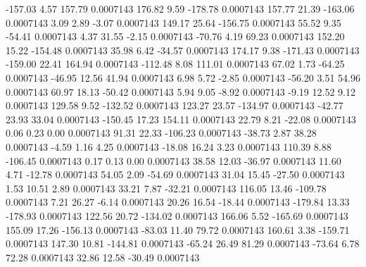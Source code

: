      -157.03        4.57      157.79     0.0007143
      176.82        9.59     -178.78     0.0007143
      157.77       21.39     -163.06     0.0007143
        3.09        2.89       -3.07     0.0007143
      149.17       25.64     -156.75     0.0007143
       55.52        9.35      -54.41     0.0007143
        4.37       31.55       -2.15     0.0007143
      -70.76        4.19       69.23     0.0007143
      152.20       15.22     -154.48     0.0007143
       35.98        6.42      -34.57     0.0007143
      174.17        9.38     -171.43     0.0007143
     -159.00       22.41      164.94     0.0007143
     -112.48        8.08      111.01     0.0007143
       67.02        1.73      -64.25     0.0007143
      -46.95       12.56       41.94     0.0007143
        6.98        5.72       -2.85     0.0007143
      -56.20        3.51       54.96     0.0007143
       60.97       18.13      -50.42     0.0007143
        5.94        9.05       -8.92     0.0007143
       -9.19       12.52        9.12     0.0007143
      129.58        9.52     -132.52     0.0007143
      123.27       23.57     -134.97     0.0007143
      -42.77       23.93       33.04     0.0007143
     -150.45       17.23      154.11     0.0007143
       22.79        8.21      -22.08     0.0007143
        0.06        0.23        0.00     0.0007143
       91.31       22.33     -106.23     0.0007143
      -38.73        2.87       38.28     0.0007143
       -4.59        1.16        4.25     0.0007143
      -18.08       16.24        3.23     0.0007143
      110.39        8.88     -106.45     0.0007143
        0.17        0.13        0.00     0.0007143
       38.58       12.03      -36.97     0.0007143
       11.60        4.71      -12.78     0.0007143
       54.05        2.09      -54.69     0.0007143
       31.04       15.45      -27.50     0.0007143
        1.53       10.51        2.89     0.0007143
       33.21        7.87      -32.21     0.0007143
      116.05       13.46     -109.78     0.0007143
        7.21       26.27       -6.14     0.0007143
       20.26       16.54      -18.44     0.0007143
     -179.84       13.33     -178.93     0.0007143
      122.56       20.72     -134.02     0.0007143
      166.06        5.52     -165.69     0.0007143
      155.09       17.26     -156.13     0.0007143
      -83.03       11.40       79.72     0.0007143
      160.61        3.38     -159.71     0.0007143
      147.30       10.81     -144.81     0.0007143
      -65.24       26.49       81.29     0.0007143
      -73.64        6.78       72.28     0.0007143
       32.86       12.58      -30.49     0.0007143
